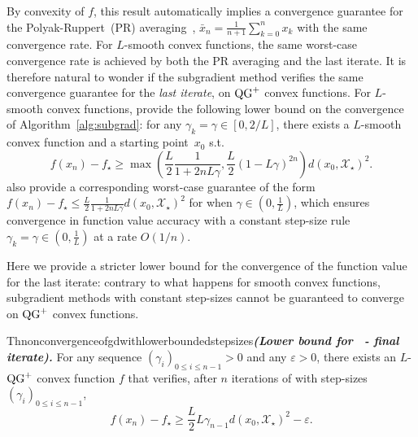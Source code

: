         By convexity of $f$, this result automatically implies a convergence guarantee for the Polyak-Ruppert~(PR) averaging~\citep{polyak1992acceleration, ruppert1988efficient}, $\bar x_n = \frac{1}{n+1}\sum_{k=0}^n x_k$ with the same convergence rate.
        For $L$-smooth convex functions, the same worst-case convergence rate is achieved by both the PR averaging and the last iterate.
        It is therefore natural to wonder if the subgradient method verifies the same convergence guarantee for the \emph{last iterate}, on $\operatorname{QG}^+$ convex functions.
        For $L$-smooth convex functions, \citet[Theorem 3.2]{drori2014performance} provide the following lower bound on the convergence of Algorithm~\ref{alg:subgrad}:
        for any $\gamma_k=\gamma \in \left[0, 2/L \right]$, there exists a $L$-smooth convex function and a starting point~$x_0$ s.t.
        \begin{equation}
            f(x_n) - f_\star \geq \max\left(\frac{L}{2}\frac{1}{1 + 2nL\gamma}, \frac{L}{2} \left( 1 - L\gamma \right)^{2n} \right)d(x_0, \mathcal{X}_\star)^2. \label{eq:gd_smooth}
        \end{equation}
        \citet[Theorem 3.1]{drori2014performance} also provide a corresponding worst-case guarantee of the form $f(x_n) - f_\star \leq \frac{L}{2}\frac{1}{1 + 2nL\gamma}d(x_0, \mathcal{X}_\star)^2$ for when $\gamma\in (0,\tfrac1L)$, which ensures convergence in function value accuracy with a constant step-size rule $\gamma_k=\gamma\in (0,\tfrac1L)$ at a rate $O(1/n)$.

        Here we provide a stricter lower bound for the convergence of the function value for the last iterate: contrary to what happens for smooth convex functions, subgradient methods with constant step-sizes cannot be guaranteed to converge on $\operatorname{QG}^+$ convex functions.

        \begin{restatable}{Th}{nonconvergenceofgdwithlowerboundedstepsizes}\textbf{\emph{(Lower bound for~ - final iterate).}}\label{thm:non_convergence_gd}
            \noindent For any sequence
            $(\gamma_i)_{0 \leq i \leq n-1}>0$ and any $\varepsilon>0$, there exists an $L$-$\operatorname{QG}^+$ convex function $f$ that verifies, after $n$ iterations of  with step-sizes $(\gamma_i)_{0 \leq i \leq n-1}$,
            \begin{equation} \label{eq:LB_QG}
                f(x_n) - f_\star \geq \frac{L}{2}L\gamma_{n-1} d(x_0, \mathcal{X}_\star)^2 - \varepsilon.
            \end{equation}
        \end{restatable}

